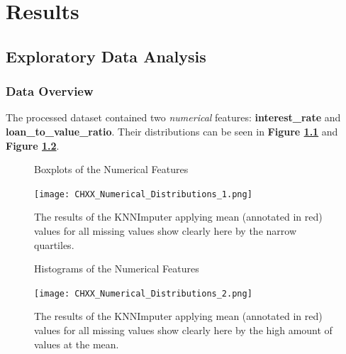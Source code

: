 \chapter{Results}\label{chap:Results}


\section{Exploratory Data Analysis}\label{sec:Exploratory_Data_Analysis}



\subsection{Data Overview}\label{subsec:Data_Overview}

The processed dataset contained two \textit{numerical} features: \textbf{interest\_rate} and \textbf{loan\_to\_value\_ratio}.
Their distributions can be seen in \textbf{Figure \ref{fig:CHXX_Numerical_Distributions_1}} and \textbf{Figure \ref{fig:CHXX_Numerical_Distributions_2}}.

\begin{figure}[h]
    \centering
    \caption{Boxplots of the Numerical Features}
    \texttt{[image: CHXX\_Numerical\_Distributions\_1.png]}
    \caption*{The results of the KNNImputer applying mean (annotated in red) values for all missing values show clearly here by the narrow quartiles.}
    \label{fig:CHXX_Numerical_Distributions_1}
\end{figure}

\begin{figure}[h]
    \centering
    \caption{Histograms of the Numerical Features}
    \texttt{[image: CHXX\_Numerical\_Distributions\_2.png]}
    \caption*{The results of the KNNImputer applying mean (annotated in red) values for all missing values show clearly here by the high amount of values at the mean.}
    \label{fig:CHXX_Numerical_Distributions_2}
\end{figure}



